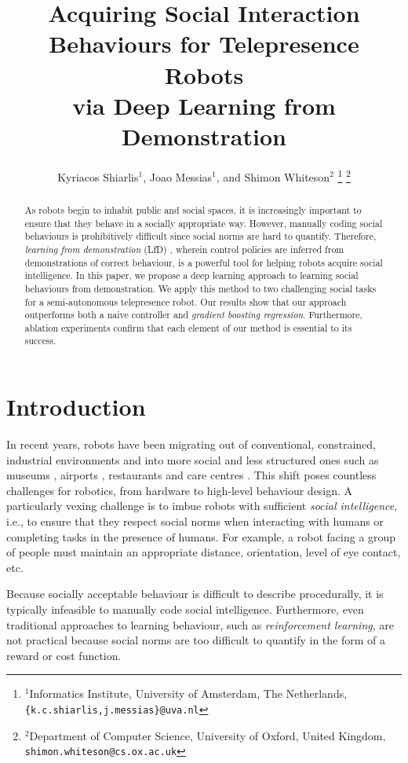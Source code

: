 \documentclass[letterpaper, 10 pt, conference]{ieeeconf}
\title{\LARGE \bf
Acquiring Social Interaction Behaviours for Telepresence Robots\\via Deep Learning from Demonstration 
}
\author{Kyriacos Shiarlis$^{1}$, Joao Messias$^{1}$, and Shimon Whiteson$^{2}$%
\thanks{$^{1}$Informatics Institute, University of Amsterdam, The Netherlands,
         {\tt\small \{k.c.shiarlis,j.messias\}@uva.nl}}%
\thanks{$^{2}$Department of Computer Science, University of Oxford, United Kingdom,
         {\tt\small shimon.whiteson@cs.ox.ac.uk}}%
}
\begin{document}
\maketitle

\thispagestyle{empty}
\pagestyle{empty}


\begin{abstract}
As robots begin to inhabit public and social spaces, it is increasingly important to ensure that they behave in a socially appropriate way. However, manually coding social behaviours is prohibitively difficult since social norms are hard to quantify.  Therefore, \emph{learning from demonstration} (LfD) \cite{argall2009survey}, wherein control policies are inferred from demonstrations of correct behaviour, is a powerful tool for helping robots acquire social intelligence. In this paper, we propose a deep learning approach to learning social behaviours from demonstration.  We apply this method to two challenging social tasks for a semi-autonomous telepresence robot.  Our results show that our approach outperforms both a naive controller and \emph{gradient boosting regression}.  Furthermore, ablation experiments confirm that each element of our method is essential to its success.
\end{abstract}

\section{Introduction}


In recent years, robots have been migrating out of conventional, constrained, industrial environments and into more social and less structured ones such as museums \cite{thrun1999minerva}, airports \cite{triebel2015spencer}, restaurants \cite{qing2010research} and care centres \cite{shiarlis2015teresa}. This shift poses countless challenges for robotics, from hardware  to high-level behaviour design.  A particularly vexing challenge is to imbue robots with sufficient \emph{social intelligence}, i.e., to ensure that they respect social norms when interacting with humans or completing tasks in the presence of humans.  For example, a robot facing a group of people must maintain an appropriate distance, orientation, level of eye contact, etc.

Because socially acceptable behaviour is difficult to describe procedurally, it is typically infeasible to manually code social intelligence.  Furthermore, even traditional approaches to learning behaviour, such as \emph{reinforcement learning}, are not practical because social norms are too difficult to quantify in the form of a reward or cost function.
\end{document}
